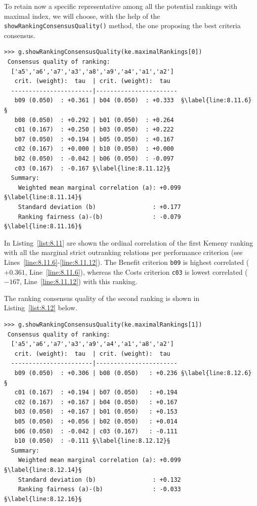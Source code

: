 To retain now a specific representative among all the potential rankings with maximal \Kemeny index, we will choose, with the help of the \texttt{showRankingCon\-sensus\-Quality()} method, the one proposing the best criteria consensus.
\begin{lstlisting}[caption={Computing the consensus quality of the first \Kemeny ranking},label=list:8.11,basicstyle=\ttfamily\scriptsize]   
>>> g.showRankingConsensusQuality(ke.maximalRankings[0])
 Consensus quality of ranking:
  ['a5','a6','a7','a3','a8','a9','a4','a1','a2']
   crit. (weight):  tau  | crit. (weight):  tau 
  -----------------------|-----------------------
   b09 (0.050)  : +0.361 | b04 (0.050)  : +0.333  §\label{line:8.11.6}§
   b08 (0.050)  : +0.292 | b01 (0.050)  : +0.264
   c01 (0.167)  : +0.250 | b03 (0.050)  : +0.222
   b07 (0.050)  : +0.194 | b05 (0.050)  : +0.167
   c02 (0.167)  : +0.000 | b10 (0.050)  : +0.000
   b02 (0.050)  : -0.042 | b06 (0.050)  : -0.097
   c03 (0.167)  : -0.167 §\label{line:8.11.12}§
  Summary:
    Weighted mean marginal correlation (a): +0.099 §\label{line:8.11.14}§
    Standard deviation (b)                : +0.177
    Ranking fairness (a)-(b)              : -0.079 §\label{line:8.11.16}§
  \end{lstlisting}

In Listing~\vref{list:8.11}  are shown the ordinal correlation of the first Kemeny ranking  with all the marginal strict outranking relations per performance criterion (see Lines~\ref{line:8.11.6}-\ref{line:8.11.12}). The Benefit criterion \texttt{b09} is highest correlated ($+0.361$, Line~\ref{line:8.11.6}), whereas the Costs criterion \texttt{c03} is lowest correlated ($-167$, Line~\ref{line:8.11.12}) with this \Kemeny ranking.

The ranking consensus quality of the second \Kemeny ranking is shown in Listing~\ref{list:8.12} below.  
\begin{lstlisting}[caption={Computing the consensus quality of the second \Kemeny ranking},label=list:8.12,basicstyle=\ttfamily\scriptsize]
>>> g.showRankingConsensusQuality(ke.maximalRankings[1])
 Consensus quality of ranking:
  ['a5','a6','a7','a3','a9','a4','a1','a8','a2']
   crit. (weight):  tau  | crit. (weight):  tau 
  -----------------------|-----------------------
   b09 (0.050)  : +0.306 | b08 (0.050)   : +0.236 §\label{line:8.12.6}§
   c01 (0.167)  : +0.194 | b07 (0.050)   : +0.194
   c02 (0.167)  : +0.167 | b04 (0.050)   : +0.167
   b03 (0.050)  : +0.167 | b01 (0.050)   : +0.153
   b05 (0.050)  : +0.056 | b02 (0.050)   : +0.014
   b06 (0.050)  : -0.042 | c03 (0.167)   : -0.111
   b10 (0.050)  : -0.111 §\label{line:8.12.12}§
  Summary:
    Weighted mean marginal correlation (a): +0.099 §\label{line:8.12.14}§
    Standard deviation (b)                : +0.132
    Ranking fairness (a)-(b)              : -0.033 §\label{line:8.12.16}§
\end{lstlisting}

